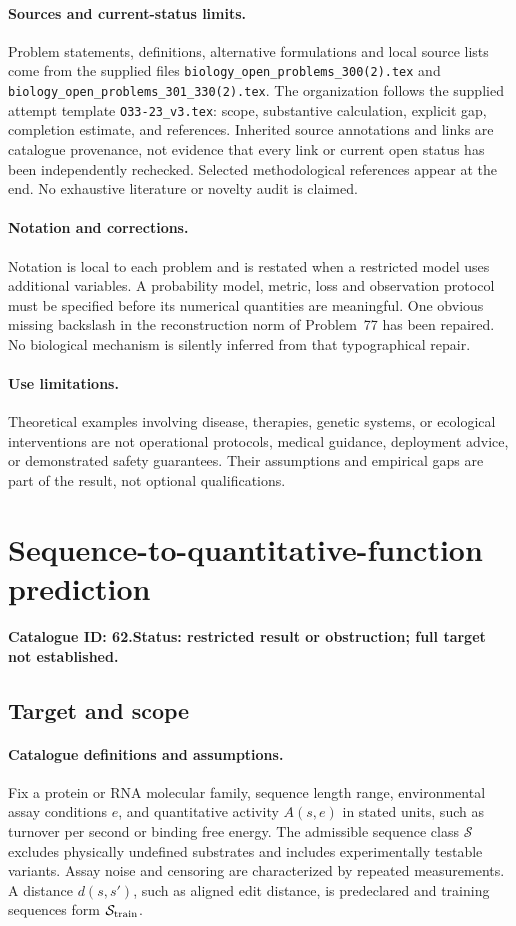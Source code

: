 \documentclass[11pt]{article}
\begin{document}
\paragraph{Sources and current-status limits.}
Problem statements, definitions, alternative formulations and local source lists
come from the supplied files
\texttt{biology\_open\_problems\_300(2).tex} and
\texttt{biology\_open\_problems\_301\_330(2).tex}.
The organization follows the supplied attempt template
\texttt{O33-23\_v3.tex}: scope, substantive calculation, explicit gap,
completion estimate, and references. Inherited source annotations and links are
catalogue provenance, not evidence that every link or current open status has
been independently rechecked. Selected methodological references appear at the
end. No exhaustive literature or novelty audit is claimed.

\paragraph{Notation and corrections.}
Notation is local to each problem and is restated when a restricted model uses
additional variables. A probability model, metric, loss and observation protocol
must be specified before its numerical quantities are meaningful. One obvious
missing backslash in the reconstruction norm of Problem~77 has been repaired.
No biological mechanism is silently inferred from that typographical repair.

\paragraph{Use limitations.}
Theoretical examples involving disease, therapies, genetic systems, or ecological
interventions are not operational protocols, medical guidance, deployment advice,
or demonstrated safety guarantees. Their assumptions and empirical gaps are part
of the result, not optional qualifications.

\setcounter{section}{61}
\section{Sequence-to-quantitative-function prediction}
\label{prob:062}
\noindent\textbf{Catalogue ID: 62.}\quad \textbf{Status: restricted result or obstruction; full target not established.}
\subsection{Target and scope}
\paragraph{Catalogue definitions and assumptions.}
Fix a protein or RNA molecular family, sequence length range, environmental assay conditions $e$, and quantitative activity $A(s,e)$ in stated units, such as turnover per second or binding free energy. The admissible sequence class $\mathcal S$ excludes physically undefined substrates and includes experimentally testable variants. Assay noise and censoring are characterized by repeated measurements. A distance $d(s,s')$, such as aligned edit distance, is predeclared and training sequences form $\mathcal S_{\rm train}$.
\end{document}
